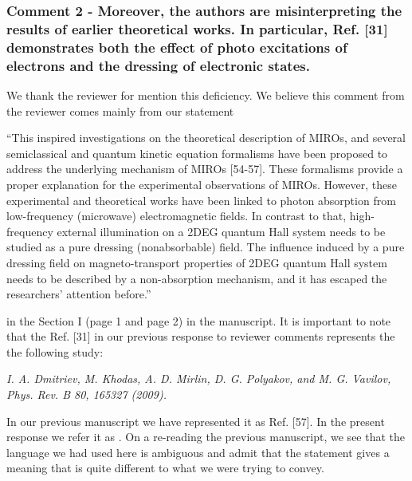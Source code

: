 \documentclass{article}
\begin{document}
\subsubsection*{Comment 2 -
\color{RoyalBlue} Moreover, the authors are misinterpreting the results of earlier theoretical works. In particular, Ref. [31] demonstrates both the effect of photo excitations of electrons and the dressing of electronic states.}

We thank the reviewer for mention this deficiency. We believe this comment from the reviewer comes mainly from our statement

{\color{CadetBlue} “This inspired investigations on the theoretical description of MIROs, and several semiclassical and quantum kinetic equation formalisms have been proposed to address the underlying mechanism of MIROs [54-57]. These formalisms provide a proper explanation for the experimental observations of MIROs. However, these experimental and theoretical works have been linked to photon absorption from low-frequency (microwave) electromagnetic fields.
In contrast to that, high-frequency external illumination on a 2DEG quantum Hall system needs to be studied as a pure dressing (nonabsorbable) field.
The influence induced by a pure dressing field on
magneto-transport properties of 2DEG quantum Hall system needs to be described by a non-absorption mechanism, and it has escaped the researchers’ attention before.”}

in the Section I (page 1 and page 2) in the manuscript. It is important to note that the Ref. [31] in our previous response to reviewer comments represents the the
following study:

\textit{I. A. Dmitriev, M. Khodas, A. D. Mirlin, D. G. Polyakov, and M. G. Vavilov, Phys. Rev. B 80, 165327 (2009).}

In our previous manuscript we have represented it as Ref. [57]. In the present response we refer it as \cite{dmitriev09}.
On a re-reading the previous manuscript, we see that the language we had used here is ambiguous and admit that the statement gives a meaning that is quite different to what we were trying to convey.
\end{document}
